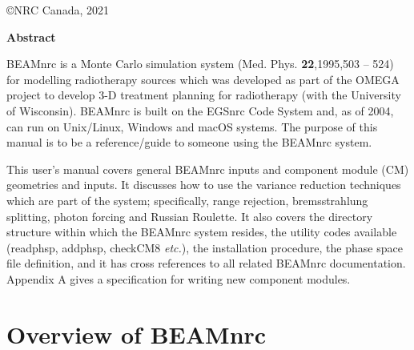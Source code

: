 \documentclass[12pt,twoside]{article}
\newcommand{\etc}{{\em etc.}}
\begin{document}
\begin{center}

\vfill
\copyright NRC Canada, 2021
\end{center}

\setlength{\baselineskip}{0.5cm}
\newpage

\pagestyle{fancy}
\setcounter{page}{2}


\newpage

\begin{center}
\begin{Large}
{\bf Abstract}
\end{Large}
\end{center}
BEAMnrc is a Monte Carlo simulation system (Med. Phys. {\bf 22},1995,503 --
524) for modelling radiotherapy
sources which was developed as part of the OMEGA project to develop 3-D
treatment planning for radiotherapy
(with the University of Wisconsin).  BEAMnrc is built on the
EGSnrc Code System\cite{KR03} and, as of 2004\cite{Ka03}, can run on Unix/Linux,
Windows and macOS systems.
The purpose of this manual is to be a reference/guide to someone
using the BEAMnrc system.

This user's manual covers general BEAMnrc inputs and component module (CM)
geometries and inputs. It discusses how to use the variance reduction techniques
which are part of the system; specifically, range rejection, bremsstrahlung
splitting, photon forcing and Russian Roulette. It also covers the directory
structure within which the BEAMnrc system resides, the utility codes available
(readphsp, addphsp, checkCM8 \etc), the installation procedure, the phase space
file definition, and it
has cross references to all related BEAMnrc documentation.
Appendix A gives a specification for writing new component
modules.
\vspace*{4cm}\\

\tableofcontents

\listoffigures

\setlength{\baselineskip}{0.5cm}

\newpage


\section{Overview of BEAMnrc}
\end{document}
